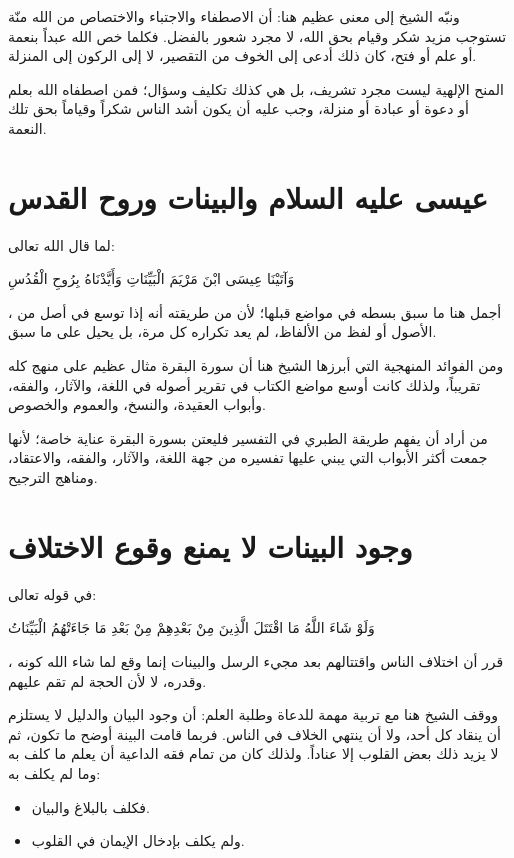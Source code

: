 ونبّه الشيخ إلى معنى عظيم هنا: أن الاصطفاء والاجتباء والاختصاص من الله منّة تستوجب مزيد شكر وقيام بحق الله، لا مجرد شعور بالفضل. فكلما خص الله عبداً بنعمة أو علم أو فتح، كان ذلك أدعى إلى الخوف من التقصير، لا إلى الركون إلى المنزلة.

\begin{fawaid}
المنح الإلهية ليست مجرد تشريف، بل هي كذلك تكليف وسؤال؛ فمن اصطفاه الله بعلم أو دعوة أو عبادة أو منزلة، وجب عليه أن يكون أشد الناس شكراً وقياماً بحق تلك النعمة.
\end{fawaid}

\section{عيسى عليه السلام والبينات وروح القدس}
لما قال الله تعالى: \begin{ayah}وَآتَيْنَا عِيسَى ابْنَ مَرْيَمَ الْبَيِّنَاتِ وَأَيَّدْنَاهُ بِرُوحِ الْقُدُسِ\end{ayah}، أجمل  هنا ما سبق بسطه في مواضع قبلها؛ لأن من طريقته أنه إذا توسع في أصل من الأصول أو لفظ من الألفاظ، لم يعد تكراره كل مرة، بل يحيل على ما سبق.

ومن الفوائد المنهجية التي أبرزها الشيخ هنا أن سورة البقرة مثال عظيم على منهج  كله تقريباً، ولذلك كانت أوسع مواضع الكتاب في تقرير أصوله في اللغة، والآثار، والفقه، وأبواب العقيدة، والنسخ، والعموم والخصوص.

\begin{fawaid}
من أراد أن يفهم طريقة الطبري في التفسير فليعتن بسورة البقرة عناية خاصة؛ لأنها جمعت أكثر الأبواب التي يبني عليها تفسيره من جهة اللغة، والآثار، والفقه، والاعتقاد، ومناهج الترجيح.
\end{fawaid}

\section{وجود البينات لا يمنع وقوع الاختلاف}
في قوله تعالى: \begin{ayah}وَلَوْ شَاءَ اللَّهُ مَا اقْتَتَلَ الَّذِينَ مِنْ بَعْدِهِمْ مِنْ بَعْدِ مَا جَاءَتْهُمُ الْبَيِّنَاتُ\end{ayah}، قرر  أن اختلاف الناس واقتتالهم بعد مجيء الرسل والبينات إنما وقع لما شاء الله كونه وقدره، لا لأن الحجة لم تقم عليهم.

ووقف الشيخ هنا مع تربية مهمة للدعاة وطلبة العلم: أن وجود البيان والدليل لا يستلزم أن ينقاد كل أحد، ولا أن ينتهي الخلاف في الناس. فربما قامت البينة أوضح ما تكون، ثم لا يزيد ذلك بعض القلوب إلا عناداً. ولذلك كان من تمام فقه الداعية أن يعلم ما كلف به وما لم يكلف به:
\begin{itemize}
    \item فكلف بالبلاغ والبيان.
    \item ولم يكلف بإدخال الإيمان في القلوب.
\end{itemize}

